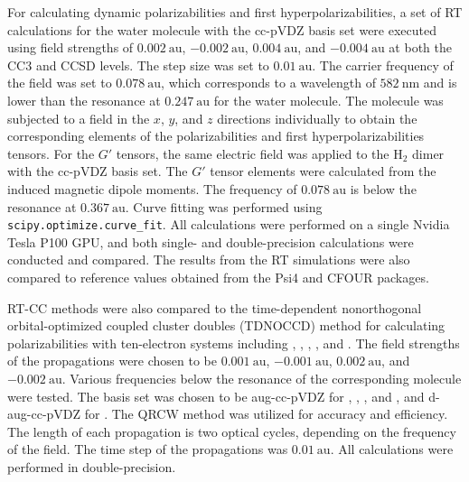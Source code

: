 For calculating dynamic polarizabilities and first hyperpolarizabilities, a set of RT calculations for the water molecule with the cc-pVDZ basis set\cite{Dunning1989} were executed using field strengths of $0.002\ \text{au}$, $-0.002\ \text{au}$, $0.004\ \text{au}$, and $-0.004\ \text{au}$ at both the CC3 and CCSD levels. The step size was set to $0.01\ \text{au}$. The carrier frequency of the field was set to $0.078\ \text{au}$, which corresponds to a wavelength of $582\ \text{nm}$ and is lower than the resonance at $0.247\ \text{au}$ for the water molecule. The molecule was subjected to a field in the $x$, $y$, and $z$ directions individually to obtain the corresponding elements of the polarizabilities and first hyperpolarizabilities tensors. For the $G'$ tensors, the same electric field was applied to the H$_{2}$ dimer with the cc-pVDZ basis set. The $G'$ tensor elements were calculated from the induced magnetic dipole moments. The frequency of $0.078\ \text{au}$ is below the resonance at $0.367\ \text{au}$. Curve fitting was performed using {\tt scipy.optimize.curve\_fit}.\cite{Virtanen2020} All calculations were performed on a single Nvidia Tesla P100 GPU, and both single- and double-precision calculations were conducted and compared. The results from the RT simulations were also compared to reference values obtained from the Psi4\cite{Smith2020} and CFOUR\cite{Matthews2020} packages. 

RT-CC methods were also compared to the time-dependent nonorthogonal orbital-optimized coupled cluster doubles (TDNOCCD) method\cite{Pedersen2001} for calculating polarizabilities with ten-electron systems including , , , , and . The field strengths of the propagations were chosen to be $0.001\ \text{au}$, $-0.001\ \text{au}$, $0.002\ \text{au}$, and $-0.002\ \text{au}$. Various frequencies below the resonance of the corresponding molecule were tested. The basis set was chosen to be aug-cc-pVDZ\cite{Woon1993} for , , , and , and d-aug-cc-pVDZ\cite{Woon1994} for . The QRCW method was utilized for accuracy and efficiency. The length of each propagation is two optical cycles, depending on the frequency of the field. The time step of the propagations was $0.01\ \text{au}$. All calculations were performed in double-precision. 

